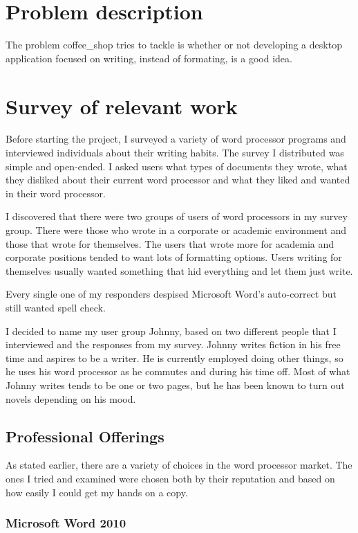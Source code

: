 \documentclass[11pt]{article}
\begin{document}
\section{Problem description}

The problem coffee\_shop tries to tackle is whether or not developing a desktop application focused on writing, instead of formating, is a good idea.

\section{Survey of relevant work}

Before starting the project, I surveyed a variety of word processor programs and interviewed individuals about their writing habits. The survey I distributed was simple and open-ended. I asked users what types of documents they wrote, what they disliked about their current word processor and what they liked and wanted in their word processor.

I discovered that there were two groups of users of word processors in my survey group. There were those who wrote in a corporate or academic environment and those that wrote for themselves. The users that wrote more for academia and corporate positions tended to want lots of formatting options. Users writing for themselves usually wanted something that hid everything and let them just write.

Every single one of my responders despised Microsoft Word's auto-correct but still wanted spell check.

I decided to name my user group Johnny, based on two different people that I interviewed and the responses from my survey. Johnny writes fiction in his free time and aspires to be a writer. He is currently employed doing other things, so he uses his word processor as he commutes and during his time off. Most of what Johnny writes tends to be one or two pages, but he has been known to turn out novels depending on his mood.

\subsection{Professional Offerings}

As stated earlier, there are a variety of choices in the word processor market. The ones I tried and examined were chosen both by their reputation and based on how easily I could get my hands on a copy.

\subsubsection{Microsoft Word 2010}
\end{document}
